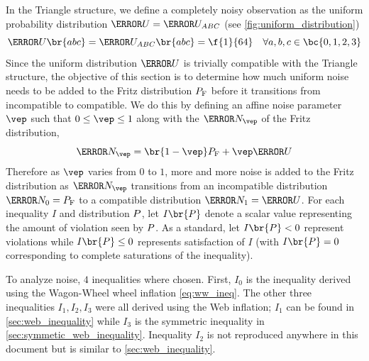 \documentclass[aps, 10pt, english, twoside, pra, nofootinbib, tightenlines, longbibliography, superscriptaddress]{revtex4-1}
\begin{document}
    In the Triangle structure, we define a completely noisy observation as the uniform probability distribution $\s{U} = \s{U}_{ABC}$ (see \cref{fig:uniform_distribution})
    \[ \s{U}\br{abc} = \s{U}_{ABC}\br{abc} = \f{1}{64} \quad \forall a,b,c\in \bc{0,1,2,3}  \]
    Since the uniform distribution $\s{U}$ is trivially compatible with the Triangle structure, the objective of this section is to determine how much uniform noise needs to be added to the Fritz distribution $\prob[\fritz]$ before it transitions from incompatible to compatible. We do this by defining an affine noise parameter $\vep$ such that $0 \leq \vep \leq 1$ along with the  $\s{N}_{\vep}$ of the Fritz distribution,
    \[ \s{N}_{\vep} = \br{1 - \vep} \prob[\fritz] + \vep \s{U} \]
    Therefore as $\vep$ varies from $0$ to $1$, more and more noise is added to the Fritz distribution as $\s{N}_{\vep}$ transitions from an incompatible distribution $\s{N}_{0} = \prob[\fritz]$ to a compatible distribution $\s{N}_{1} = \s{U}$. For each inequality $I$ and distribution $\prob$, let $I\br{\prob}$ denote a scalar value representing the amount of violation seen by $\prob$. As a standard, let $I\br{\prob} < 0$ represent violations while $I\br{\prob} \leq 0$ represents satisfaction of $I$ (with $I\br{\prob} = 0$ corresponding to complete saturations of the inequality).

    To analyze noise, $4$ inequalities where chosen. First, $I_0$ is the inequality derived using the Wagon-Wheel wheel inflation \cref{eq:ww_ineq}. The other three inequalities $I_1, I_2, I_3$ were all derived using the Web inflation; $I_1$ can be found in \cref{sec:web_inequality} while $I_3$ is the symmetric inequality in \cref{sec:symmetic_web_inequality}. Inequality $I_2$ is not reproduced anywhere in this document but is similar to \cref{sec:web_inequality}.
\end{document}
